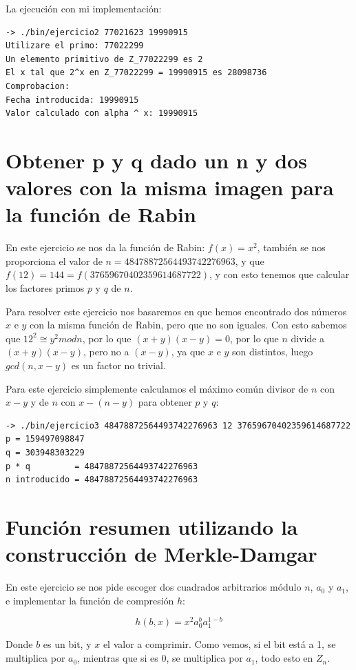 \documentclass[12pt, spanish]{article}
\begin{document}
La ejecución con mi implementación:

\begin{lstlisting}
-> ./bin/ejercicio2 77021623 19990915
Utilizare el primo: 77022299
Un elemento primitivo de Z_77022299 es 2
El x tal que 2^x en Z_77022299 = 19990915 es 28098736
Comprobacion:
Fecha introducida: 19990915
Valor calculado con alpha ^ x: 19990915
\end{lstlisting}


\section{Obtener p y q dado un n y dos valores con la misma imagen para la función de Rabin}

En este ejercicio se nos da la función de Rabin: $f(x) = x^2$, también se nos proporciona el valor de $n = 48478872564493742276963$, y que $f (12) =144 = f (37659670402359614687722)$, y con esto tenemos que calcular los factores primos $p$ y $q$ de $n$.

Para resolver este ejercicio nos basaremos en que hemos encontrado dos números $x$ e $y$ con la misma función de Rabin, pero que no son iguales. Con esto sabemos que $12^2 \cong y^2 mod n$, por lo que $(x + y)(x - y) = 0$, por lo que $n$ divide a $(x + y)(x - y)$, pero no a $(x - y)$, ya que $x$ e $y$ son distintos, luego $gcd(n, x - y)$ es un factor no trivial.

Para este ejercicio simplemente calculamos el máximo común divisor de $n$ con $x - y$ y de $n$ con $x - (n - y)$ para obtener $p$ y $q$:

\begin{lstlisting}
-> ./bin/ejercicio3 48478872564493742276963 12 37659670402359614687722
p = 159497098847
q = 303948303229
p * q         = 48478872564493742276963
n introducido = 48478872564493742276963
\end{lstlisting}


\section{Función resumen utilizando la construcción de Merkle-Damgar}

En este ejercicio se nos pide escoger dos cuadrados arbitrarios módulo $n$, $a_0$ y $a_1$, e implementar la función de compresión $h$:

$$
h(b,x) = x^2 a_0^b a_1^{1 - b}
$$

Donde $b$ es un bit, y $x$ el valor a comprimir. Como vemos, si el bit está a 1, se multiplica por $a_0$, mientras que si es 0, se multiplica por $a_1$, todo esto en $Z_n$.
\end{document}
